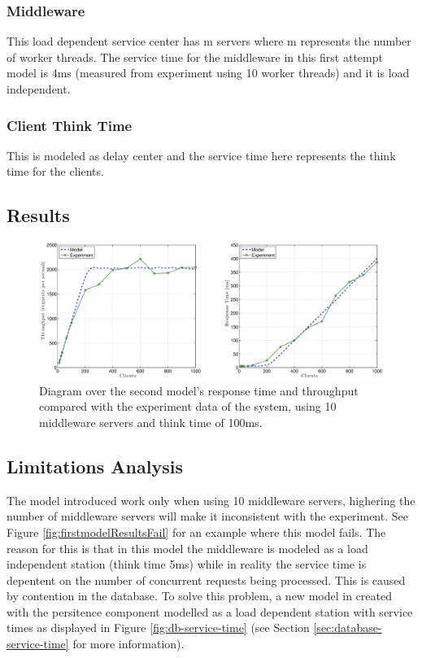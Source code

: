 \documentclass[a4paper, 11pt]{article}
\begin{document}
\subsubsection{Middleware}
This load dependent service center has m servers where m represents the number of worker threads. The service time for the middleware in this first attempt model is 4ms (measured from experiment using 10 worker threads) and it is load independent.

\subsubsection{Client Think Time}
This is modeled as delay center and the service time here represents the think time for the clients.

\subsection{Results}
\begin{figure}[ch!]
	\centering
		\includegraphics[width=1\linewidth,keepaspectratio]{firstRealAndModelRespAndThroughput}
	\caption{Diagram over the second model's response time and throughput compared with the experiment data of the system, using 10 middleware servers and think time of 100ms.}
	\label{fig:firstmodelResults}
\end{figure}
\FloatBarrier

\subsection{Limitations Analysis}
	The model introduced work only when using 10 middleware servers, highering the number of middleware servers will make it inconsistent with the experiment. See Figure \ref{fig:firstmodelResultsFail} for an example where this model fails. The reason for this is that in this model the middleware is modeled as a load independent station (think time 5ms) while in reality the service time is depentent on the number of concurrent requests being processed. This is caused by contention in the database. To solve this problem, a new model in created with the persitence component modelled as a load dependent station with service times as displayed in Figure \ref{fig:db-service-time} (see Section \ref{sec:database-service-time} for more information).
\end{document}
